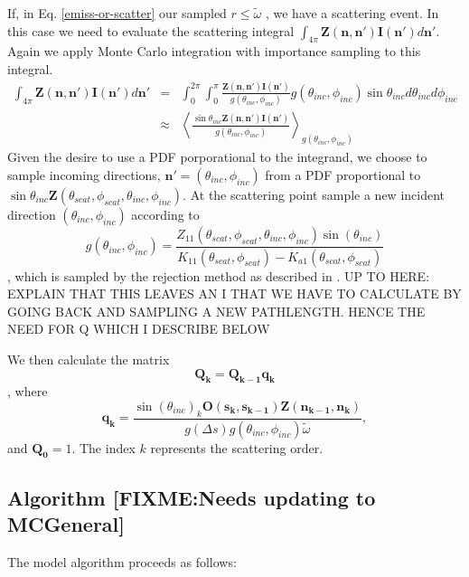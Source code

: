If, in Eq. \ref{emiss-or-scatter} our sampled $r\le\tilde{\omega}$
, we have a scattering event.  In this case we need to evaluate the scattering
integral $\int_{4\pi}\mathbf{Z(n,n')}\mathbf{I(n')}d\mathbf{n'}$.
Again we apply Monte Carlo integration with importance sampling to
this integral.
\begin{eqnarray}
\int_{4\pi}\mathbf{Z(n,n')}\mathbf{I(n')}d\mathbf{n'}&=&\int_0^{2\pi}\int_0^\pi\frac{\mathbf{Z(n,n')}\mathbf{I(n')}}{g(\theta_{inc},\phi_{inc})}g(\theta_{inc},\phi_{inc})\sin{\theta_{inc}}d\theta_{inc}d\phi_{inc}\\
&\approx&\left\langle\frac{\sin{\theta_{inc}}\mathbf{Z(n,n')}\mathbf{I(n')}}{g(\theta_{inc},\phi_{inc})}\right\rangle_{g(\theta_{inc},\phi_{inc})}
\end{eqnarray}
Given the desire to use a PDF porporational to the integrand, we
choose to sample incoming directions,
$\mathbf{n'}=(\theta_{inc},\phi_{inc})$ from a PDF proportional
to $\sin{\theta_{inc}}\mathbf{Z}(\theta_{scat},\phi_{scat},\theta_{inc},\phi_{inc})$.
At the scattering point sample a new incident direction
  $(\theta_{inc},\phi_{inc})$ according to 
\begin{equation}
g(\theta_{inc},\phi_{inc})=\frac{Z_{11}(\theta_{scat},\phi_{scat},
\theta_{inc},\phi_{inc})\sin(\theta_{inc})}{K_{11}(\theta_{scat},\phi_{scat})
  - K_{a1}(\theta_{scat},\phi_{scat})}
\label{gdir}
\end{equation}
, which is
sampled by the rejection method as described in \cite{liu:01}. 
UP TO HERE: EXPLAIN THAT THIS LEAVES AN I THAT WE HAVE TO CALCULATE BY
GOING BACK AND SAMPLING A NEW PATHLENGTH.  HENCE THE NEED FOR Q WHICH
I DESCRIBE BELOW

We then calculate the matrix
\begin{equation}
\mathbf{Q_k}=\mathbf{Q_{k-1}q_k}
\label{Q}
\end{equation}
, where
\begin{equation}
\mathbf{q_k}=\frac{\sin(\theta_{inc})_k
  \mathbf{O(s_k,s_{k-1})}\mathbf{Z(n_{k-1},n_k)}}
  {g\left(\Delta s\right)g(\theta_{inc},\phi_{inc}) \tilde{\omega}} ,
\label{q}
\end{equation}
and $\mathbf{Q_0}={1}$. The index $k$ represents the
scattering order. 


\subsection{Algorithm [FIXME:Needs updating to MCGeneral]}
 \label{sec:montecarlo:alg}
The model algorithm proceeds as follows:

